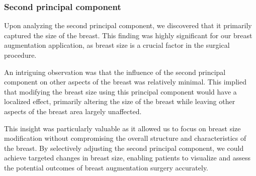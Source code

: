 \subsubsection{Second principal component}

Upon analyzing the second principal component, we discovered that it primarily captured the size of the breast. This finding was highly significant for our breast augmentation application, 
as breast size is a crucial factor in the surgical procedure.

An intriguing observation was that the influence of the second principal component on other aspects of the breast was relatively minimal. This implied that modifying the breast size 
using this principal component would have a localized effect, primarily altering the size of the breast while leaving other aspects of the breast area largely unaffected.

This insight was particularly valuable as it allowed us to focus on breast size modification without compromising the overall structure and characteristics of the breast. 
By selectively adjusting the second principal component, we could achieve targeted changes in breast size, enabling patients to visualize and assess the potential outcomes of breast augmentation surgery accurately.

